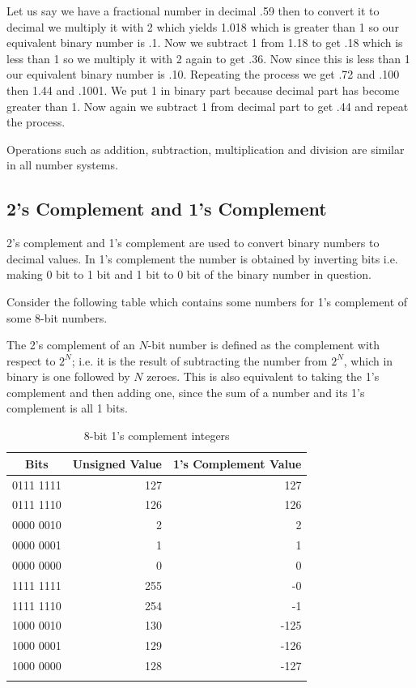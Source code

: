 Let us say we have a fractional number in decimal .59 then to convert it to
decimal we multiply it with 2 which yields 1.018 which is greater than 1 so our
equivalent binary number is .1. Now we subtract 1 from 1.18 to get .18 which
is less than 1 so we multiply it with 2 again to get .36. Now since this is
less than 1 our equivalent binary number is .10. Repeating the process we get
.72 and .100 then 1.44 and .1001. We put 1 in binary part because decimal part
has become greater than 1. Now again we subtract 1 from decimal part to get .44
and repeat the process.

Operations such as addition, subtraction, multiplication and division are
similar in all number systems.

\subsection{2's Complement and 1's Complement}
2's complement and 1's complement are used to convert binary numbers to decimal
values. In 1's complement the number is obtained by inverting bits i.e. making
0 bit to 1 bit and 1 bit to 0 bit of the binary number in question.

Consider the following table which contains some numbers for 1's complement
of some 8-bit numbers.

The 2's complement of an $N$-bit number is defined as the complement with
respect to $2^N$; i.e. it is the result of subtracting the number
from $2^N$, which in binary is one followed by $N$ zeroes. This is also
equivalent to taking the 1's complement and then adding one, since the sum of
a number and its 1's complement is all 1 bits.



 \begin{center}
\begin{longtable}{|c|r|r|}
\hline
\textbf{Bits}&\textbf{Unsigned Value}&\textbf{1's Complement Value}\\
\hline
0111 1111&127&127\\
\hline
0111 1110&126&126\\
\hline
0000 0010&2&2\\
\hline
0000 0001&1&1\\
\hline
0000 0000&0&0\\
\hline
1111 1111&255&-0\\
\hline
1111 1110&254&-1\\
\hline
1000 0010&130&-125\\
\hline
1000 0001&129&-126\\
\hline
1000 0000&128&-127\\
\hline
 \caption{8-bit 1's complement integers}
\end{longtable}
\end{center}

